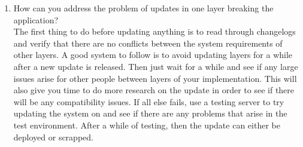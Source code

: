 \documentclass[12pt]{article}
\theoremstyle{plain}
\theoremstyle{definition}
\theoremstyle{plain}
\begin{document}
\begin{enumerate}
\item How can you address the problem of updates in one layer breaking the application?\\
	The first thing to do before updating anything is to read through changelogs and verify that there are no conflicts between the system requirements of other layers. A good system to follow is to avoid updating layers for a while after a new update is released. Then just wait for a while and see if any large issues arise for other people between layers of your implementation. This will also give you time to do more research on the update in order to see if there will be any compatibility issues. If all else fails, use a testing server to try updating the system on and see if there are any problems that arise in the test environment. After a while of testing, then the update can either be deployed or scrapped.
\end{enumerate}
\end{document}
